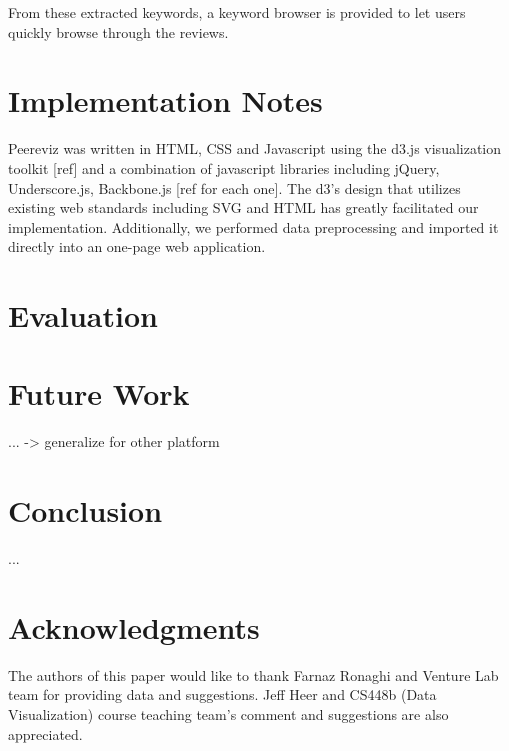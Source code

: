 \documentclass{sigchi}
\begin{document}
From these extracted keywords, a keyword browser is provided to let users
quickly browse through the reviews.




\section{Implementation Notes}
Peereviz was written in HTML, CSS and Javascript using the d3.js visualization
toolkit [ref] and a combination of javascript libraries including jQuery,
Underscore.js, Backbone.js [ref for each one].  The d3’s design that utilizes
existing web standards including SVG and HTML has greatly facilitated our
implementation.  Additionally, we performed data preprocessing and imported it
directly into an one-page web application.


\section{Evaluation}

\section{Future Work}
... -> generalize for other platform

\section{Conclusion}
...

\section{Acknowledgments}
The authors of this paper would like to thank Farnaz Ronaghi and Venture Lab
team for providing data and suggestions.
Jeff Heer and CS448b (Data Visualization) course teaching team's comment
and suggestions are also appreciated.

%
%
%
%
%



\end{document}
